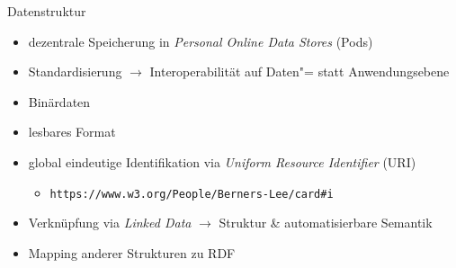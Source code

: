 \begin{frame}{Datenstruktur}
    \begin{itemize}
        \item dezentrale Speicherung in \emph{Personal Online Data Stores} (Pods)~\cite{mecklerWebLinkedData2023,sambraSolidPlatformDecentralized2016}
        \item Standardisierung $\to$ Interoperabilität auf Daten"= statt Anwendungsebene
        
        \item Binärdaten 
        
        \pause
        \item lesbares Format 
        
        \pause
        \pause
        \item global eindeutige Identifikation via \emph{Uniform Resource Identifier} (URI)~\cite{sambraSolidPlatformDecentralized2016}
        \begin{itemize}
            \item \texttt{https://www.w3.org/People/Berners-Lee/card\#i}~\cite{bizerLinkedDataStory2009}
        \end{itemize}

        \pause
        \item Verknüpfung via \emph{Linked Data} $\to$ Struktur \& automatisierbare Semantik~\cite{bizerLinkedDataStory2009,mecklerWebLinkedData2023}
        
        \pause
        \item Mapping anderer Strukturen zu RDF~\cite{mecklerWebLinkedData2023,sambraSolidPlatformDecentralized2016}
    \end{itemize}
\end{frame}


